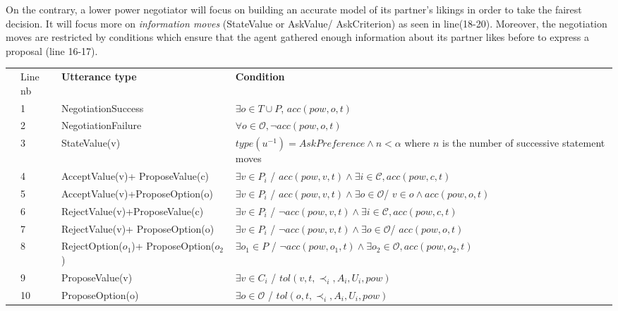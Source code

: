 \documentclass{llncs}
\begin{document}
	On the contrary, a lower power negotiator will focus on building an accurate model of its partner's likings in order to take the fairest decision. It will focus more on \emph{information moves} (StateValue or AskValue/ AskCriterion) as seen in line(18-20). Moreover, the negotiation moves are restricted by conditions which ensure that the agent gathered enough information about its partner likes before to express a proposal (line 16-17).
	
	
	\begin{table}[!t]
		{\scriptsize
			\centering
			\begin{tabular}{|p{.3cm}|p{.6cm}|p{3cm}|p{7.5cm}|}
				\hline
				\parbox[t]{2mm}{}&Line nb& \textbf{Utterance type} & \textbf{Condition} \\
				&1&NegotiationSuccess & $\exists o \in T\cup P$, $acc(pow,o,t)$ \\
				& 2& NegotiationFailure & $ \forall o \in \mathcal{O},  \neg acc(pow,o,t)$\\
				&3& StateValue(v) & $type(u^{-1}) = AskPreference \land n < \alpha$ \newline where $n$ is the number of successive statement moves\\
				&4& AcceptValue(v)+ \newline ProposeValue(c) & $ \exists v \in P_i$ / $acc(pow,v,t) \land \exists i\in\mathcal{C}, acc(pow,c,t)$ \\
				&5& AcceptValue(v)+\newline ProposeOption(o) &  $ \exists v \in P_i$ / $ acc(pow,v,t) \land \exists o \in \mathcal{O}$/ $ v \in o \land acc(pow,o,t)$ \\
				&6& RejectValue(v)+\newline ProposeValue(c) & $ \exists v \in P_i$ / $ \neg acc(pow,v,t) \land \exists i\in\mathcal{C}, acc(pow,c,t)$ \\
				&7& RejectValue(v)+ \newline ProposeOption(o) &  $ \exists v \in P_i$ / $  \neg acc(pow,v,t) \land \exists o \in \mathcal{O}$/ $acc(pow,o,t)$ \\
				& 8&RejectOption($o_1$)+ ProposeOption($o_2$) & $ \exists o_1 \in P$ / $ \neg acc(pow,o_1,t) \land \exists o_2\in\mathcal{O}, acc(pow,o_2,t)$ \\
				&9& ProposeValue(v) & $\exists v \in C_i$ / $tol(v, t, \prec_i, A_i, U_i, pow)$\\
				&10& ProposeOption(o) & $\exists o \in \mathcal{O}$ / $tol(o, t, \prec_i, A_i, U_i, pow)$\\
				

\end{tabular}}
\end{table}
\end{document}
